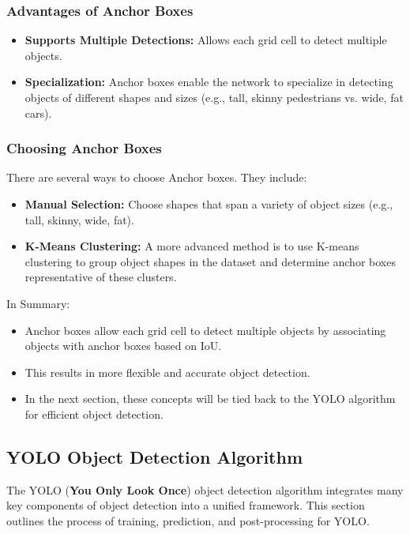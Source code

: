 \documentclass[letterpaper,12pt,notitlepage,twoside]{report}
\begin{document}
\subsubsection*{Advantages of Anchor Boxes}
\begin{itemize}
    \item \textbf{Supports Multiple Detections:} Allows each grid cell to detect multiple objects.
    \item \textbf{Specialization:} Anchor boxes enable the network to specialize in detecting objects of different shapes and sizes (e.g., tall, skinny pedestrians vs. wide, fat cars).
\end{itemize}

\subsubsection*{Choosing Anchor Boxes}
There are several ways to choose Anchor boxes. They include:
\begin{itemize}
    \item \textbf{Manual Selection:} Choose shapes that span a variety of object sizes (e.g., tall, skinny, wide, fat).
    \item \textbf{K-Means Clustering:} A more advanced method is to use K-means clustering to group object shapes in the dataset and determine anchor boxes representative of these clusters.
\end{itemize}

In Summary:
\begin{itemize}[nosep]
    \item Anchor boxes allow each grid cell to detect multiple objects by associating objects with anchor boxes based on IoU.
    \item This results in more flexible and accurate object detection.
    \item In the next section, these concepts will be tied back to the YOLO algorithm for efficient object detection.
\end{itemize}


\subsection{YOLO Object Detection Algorithm}
The YOLO (\textbf{You Only Look Once}) object detection algorithm integrates many key components of object detection into a unified framework. This section outlines the process of training, prediction, and post-processing for YOLO.
\end{document}
